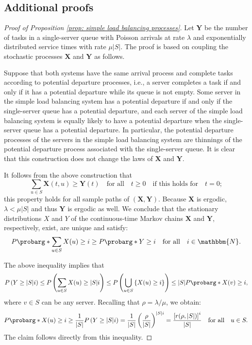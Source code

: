 \documentclass[a4paper, 12pt]{article}
\theoremstyle{definition}
\newcommand{\bX}{\boldsymbol{X}}
\newcommand{\bY}{\boldsymbol{Y}}
\newcommand{\N}{\mathbbm{N}}
\newcommand{\cprob}{P\probarg}
\begin{document}
\begin{appendices}
	
\section{Additional proofs}
\label{app: proofs of several results}

\begin{proof}[Proof of Proposition \ref{prop: simple load balancing processes}]
	Let $\bY$ be the number of tasks in a single-server queue with Poisson arrivals at rate $\lambda$ and exponentially distributed service times with rate $\mu |S|$. The proof is based on coupling the stochastic processes $\bX$ and $\bY$ as follows.
	
	Suppose that both systems have the same arrival process and complete tasks according to potential departure processes, i.e., a server completes a task if and only if it has a potential departure while its queue is not empty. Some server in the simple load balancing system has a potential departure if and only if the single-server queue has a potential departure, and each server of the simple load balancing system is equally likely to have a potential departure when the single-server queue has a potential departure. In particular, the potential departure processes of the servers in the simple load balancing system are thinnings of the potential departure process associated with the single-server queue. It is clear that this construction does not change the laws of $\bX$ and $\bY$.
	
	It follows from the above construction that
	\begin{equation*}
		\sum_{u \in S} \bX(t, u) \geq \bY(t) \quad \text{for all} \quad t \geq 0 \quad \text{if this holds for} \quad t = 0;
	\end{equation*}
	this property holds for all sample paths of $(\bX, \bY)$. Because $\bX$ is ergodic, $\lambda < \mu |S|$ and thus $\bY$ is ergodic as well. We conclude that the stationary distributions $X$ and $Y$ of the continuous-time Markov chains $\bX$ and $\bY$, respectively, exist, are unique and satisfy:
	\begin{equation*}
		\cprob*{\sum_{u \in S} X(u) \geq i} \geq \cprob*{Y \geq i} \quad \text{for all} \quad i \in \N.
	\end{equation*}
	
	The above inequality implies that
	\begin{equation*}
		P\left(Y \geq |S|i\right) \leq P\left(\sum_{u \in S} X(u) \geq |S|i\right) \leq P\left(\bigcup_{u \in S} \left\{X(u) \geq i\right\}\right) \leq |S|\cprob*{X(v) \geq i},
	\end{equation*}
	where $v \in S$ can be any server. Recalling that $\rho = \lambda / \mu$, we obtain:
	\begin{equation*}
		\cprob*{X(u) \geq i} \geq \frac{1}{|S|}P\left(Y \geq |S|i\right) = \frac{1}{|S|}\left(\frac{\rho}{|S|}\right)^{|S|i} = \frac{\left[r(\rho, |S|)\right]^i}{|S|} \quad \text{for all} \quad u \in S.
	\end{equation*}
	The claim follows directly from this inequality.
\end{proof}


\end{appendices}
\end{document}
